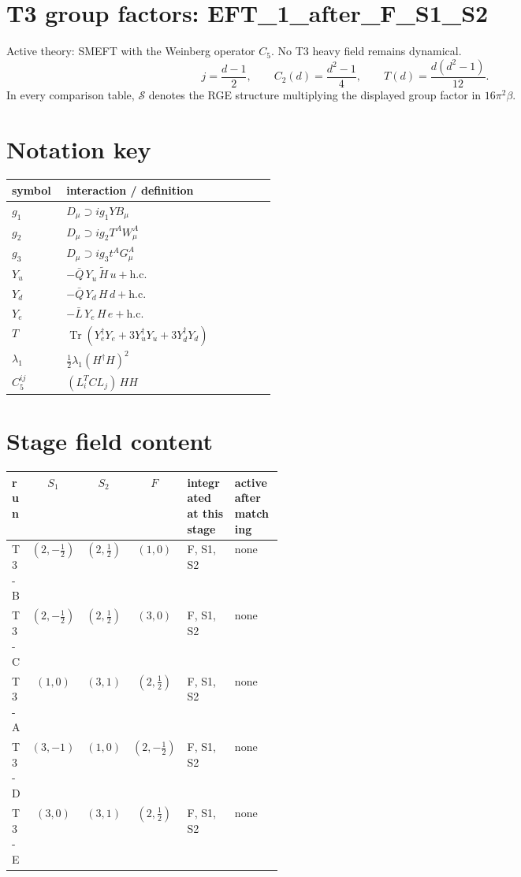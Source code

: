 \documentclass[9pt]{article}
\begin{document}
\section*{T3 group factors: EFT\_1\_after\_F\_S1\_S2}
Active theory: SMEFT with the Weinberg operator $C_5$.  No T3 heavy field remains dynamical.
\[j=\frac{d-1}{2},\qquad C_2(d)=\frac{d^2-1}{4},\qquad T(d)=\frac{d(d^2-1)}{12}.\]
In every comparison table, $\mathcal{S}$ denotes the RGE structure multiplying the displayed group factor in $16\pi^2\beta$.
\section*{Notation key}
\begin{longtable}{@{}p{0.19\linewidth}p{0.73\linewidth}@{}}
\toprule
symbol & interaction / definition \\
\midrule
$g_1$ & $D_\mu\supset i g_1 Y B_\mu$ \\
$g_2$ & $D_\mu\supset i g_2 T^A W_\mu^A$ \\
$g_3$ & $D_\mu\supset i g_3 t^A G_\mu^A$ \\
$Y_u$ & $-\bar Q\,Y_u\,\widetilde H\,u+\mathrm{h.c.}$ \\
$Y_d$ & $-\bar Q\,Y_d\,H\,d+\mathrm{h.c.}$ \\
$Y_e$ & $-\bar L\,Y_e\,H\,e+\mathrm{h.c.}$ \\
$T$ & $\operatorname{Tr}\!\left(Y_e^\dagger Y_e+3Y_u^\dagger Y_u+3Y_d^\dagger Y_d\right)$ \\
$\lambda_1$ & $\frac12\lambda_1(H^\dagger H)^2$ \\
$C_5^{ij}$ & $(L_i^T C L_j)\,H H$ \\
\bottomrule
\end{longtable}
\section*{Stage field content}
\begin{longtable}{@{}lccc p{0.20\linewidth}p{0.20\linewidth}@{}}
\toprule
run & $S_1$ & $S_2$ & $F$ & integrated at this stage & active after matching \\
\midrule
T3-B & $(2,- \frac{1}{2})$ & $(2,\frac{1}{2})$ & $(1,0)$ & F, S1, S2 & none \\
T3-C & $(2,- \frac{1}{2})$ & $(2,\frac{1}{2})$ & $(3,0)$ & F, S1, S2 & none \\
T3-A & $(1,0)$ & $(3,1)$ & $(2,\frac{1}{2})$ & F, S1, S2 & none \\
T3-D & $(3,-1)$ & $(1,0)$ & $(2,- \frac{1}{2})$ & F, S1, S2 & none \\
T3-E & $(3,0)$ & $(3,1)$ & $(2,\frac{1}{2})$ & F, S1, S2 & none \\
\bottomrule
\end{longtable}
\end{document}
